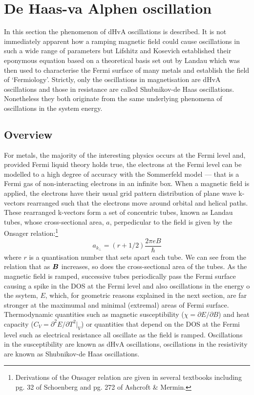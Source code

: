 
\section{De Haas-va Alphen oscillation}

In this section the phenomenon of \ac{dHvA} oscillations is described. It is not immediately apparent how a ramping magnetic field could cause oscillations in such a wide range of parameters but Lifshitz and Kosevich established their eponymous equation based on a theoretical basis set out by Landau which was then used to characterise the Fermi surface of many metals and establish the field of `Fermiology'. Strictly, only the oscillations in magnetisation are \ac{dHvA} oscillations and those in resistance are called Shubnikov-de Haas oscillations. Nonetheless they both originate from the same underlying phenomena of oscillations in the system energy.

\subsection{Overview}

For metals, the majority of the interesting physics occurs at the Fermi level and, provided Fermi liquid theory holds true, the electrons at the Fermi level can be modelled to a high degree of accuracy with the Sommerfeld model --- that is a Fermi gas of non-interacting electrons in an infinite box. When a magnetic field is applied, the electrons have their usual grid pattern distribution of plane wave k-vectors rearranged such that the electrons move around orbital and helical paths. These rearranged k-vectors form a set of concentric tubes, known as Landau tubes, whose cross-sectional area, $a$, perpedicular to the field is given by the Onsager relation:\footnote{Derivations of the Onsager relation are given in several textbooks including pg. 32 of Schoenberg\cite{Schoenberg1984} and pg. 272 of Ashcroft \& Mermin\cite{Ashcroft1976}.} 
\begin{equation}
\label{Eqn:Theo:Onsager}
\textit{a}_{k_{\perp}} = (r + 1/2)\frac{2\pi e B}{\hbar}
\end{equation}
where $r$ is a quantisation number that sets apart each tube. We can see from the relation that as $\boldsymbol{B}$ increases, so does the cross-sectional area of the tubes. As the magnetic field is ramped, successive tubes periodically pass the Fermi surface causing a spike in the \ac{DOS} at the Fermi level and also oscillations in the energy o the ssytem, $E$, which, for geometric reasons explained in the next section, are far stronger at the maximumal and minimal (extremal) areas of Fermi surface. Thermodynamic quantities such as magnetic susceptibility ($\chi = \partial E/\partial B$) and heat capacity ($C_{V} = \partial^2E/\partial T^2|_{V}$) or quantities that depend on the \ac{DOS} at the Fermi level such as electrical resistance all oscillate as the field is ramped. Oscillations in the susceptibility are known as \ac{dHvA} oscillations, oscillations in the resistivity are known as Shubnikov-de Haas oscillations.

